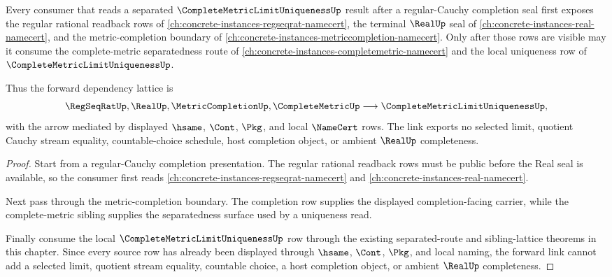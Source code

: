 \begin{theorem}
\label{thm:complete-metric-limit-uniqueness-regular-cauchy-forward-link}
Every consumer that reads a separated $\CompleteMetricLimitUniquenessUp$ result after a regular-Cauchy completion seal first exposes the regular rational readback rows of \autoref{ch:concrete-instances-regseqrat-namecert}, the terminal $\RealUp$ seal of \autoref{ch:concrete-instances-real-namecert}, and the metric-completion boundary of \autoref{ch:concrete-instances-metriccompletion-namecert}. Only after those rows are visible may it consume the complete-metric separatedness route of \autoref{ch:concrete-instances-completemetric-namecert} and the local uniqueness row of $\CompleteMetricLimitUniquenessUp$.

Thus the forward dependency lattice is
$$
\RegSeqRatUp,\RealUp,\MetricCompletionUp,\CompleteMetricUp
\longrightarrow
\CompleteMetricLimitUniquenessUp,
$$
with the arrow mediated by displayed $\hsame$, $\Cont$, $\Pkg$, and local $\NameCert$ rows. The link exports no selected limit, quotient Cauchy stream equality, countable-choice schedule, host completion object, or ambient $\RealUp$ completeness.
\end{theorem}
\begin{proof}
Start from a regular-Cauchy completion presentation. The regular rational readback rows must be public before the Real seal is available, so the consumer first reads \autoref{ch:concrete-instances-regseqrat-namecert} and \autoref{ch:concrete-instances-real-namecert}.

Next pass through the metric-completion boundary. The completion row supplies the displayed completion-facing carrier, while the complete-metric sibling supplies the separatedness surface used by a uniqueness read.

Finally consume the local $\CompleteMetricLimitUniquenessUp$ row through the existing separated-route and sibling-lattice theorems in this chapter. Since every source row has already been displayed through $\hsame$, $\Cont$, $\Pkg$, and local naming, the forward link cannot add a selected limit, quotient stream equality, countable choice, a host completion object, or ambient $\RealUp$ completeness.
\end{proof}
